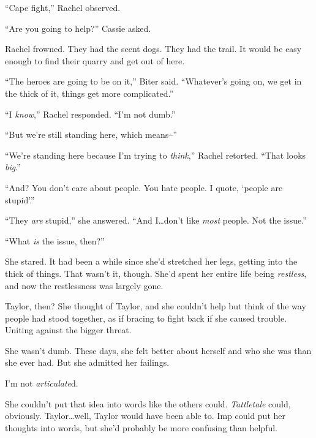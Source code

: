 ``Cape fight,'' Rachel observed.



``Are you going to help?'' Cassie asked.



Rachel frowned.  They had the scent dogs.  They had the trail.  It would be easy enough to find their quarry and get out of here.



``The heroes are going to be on it,'' Biter said.  ``Whatever's going on, we get in the thick of it, things get more complicated.''



``I \emph{know},'' Rachel responded.  ``I'm not dumb.''



``But we're still standing here, which means--''



``We're standing here because I'm trying to \emph{think},'' Rachel retorted.  ``That looks \emph{big}.''



``And?  You don't care about people.  You hate people.  I quote, `people are stupid'.''



``They \emph{are} stupid,'' she answered.  ``And I\ldots don't like \emph{most} people.  Not the issue.''



``What \emph{is} the issue, then?''



She stared.  It had been a while since she'd stretched her legs, getting into the thick of things.  That wasn't it, though.  She'd spent her entire life being \emph{restless}, and now the restlessness was largely gone.



Taylor, then?  She thought of Taylor, and she couldn't help but think of the way people had stood together, as if bracing to fight back if she caused trouble.  Uniting against the bigger threat.



She wasn't dumb.  These days, she felt better about herself and who she was than she ever had.  But she admitted her failings.



I'm not \emph{articulate}d.



She couldn't put that idea into words like the others could.  \emph{Tattletale} could, obviously.  Taylor\ldots well, Taylor would have been able to.  Imp could put her thoughts into words, but she'd probably be more confusing than helpful.



